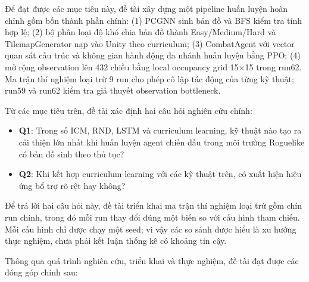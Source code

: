 \vspace{0.5cm}

Để đạt được các mục tiêu này, đề tài xây dựng một pipeline huấn luyện hoàn chỉnh gồm bốn thành phần chính: (1) PCGNN sinh bản đồ và BFS kiểm tra tính hợp lệ; (2) bộ phân loại độ khó chia bản đồ thành Easy/Medium/Hard và TilemapGenerator nạp vào Unity theo curriculum; (3) CombatAgent với vector quan sát cấu trúc và không gian hành động đa nhánh huấn luyện bằng PPO; (4) mở rộng observation lên 432 chiều bằng local occupancy grid 15$\times$15 trong run62. Ma trận thí nghiệm loại trừ 9 run cho phép cô lập tác động của từng kỹ thuật; run59 và run62 kiểm tra giả thuyết observation bottleneck.

\vspace{0.5cm}

Từ các mục tiêu trên, đề tài xác định hai câu hỏi nghiên cứu chính:

\renewcommand{\labelitemi}{$-$}
\begin{itemize}
    \item \textbf{Q1}: Trong số ICM, RND, LSTM và curriculum learning, kỹ thuật nào tạo ra cải thiện lớn nhất khi huấn luyện agent chiến đấu trong môi trường Roguelike có bản đồ sinh theo thủ tục?
    \item \textbf{Q2}: Khi kết hợp curriculum learning với các kỹ thuật trên, có xuất hiện hiệu ứng bổ trợ rõ rệt hay không?
\end{itemize}

Để trả lời hai câu hỏi này, đề tài triển khai ma trận thí nghiệm loại trừ gồm chín run chính, trong đó mỗi run thay đổi đúng một biến so với cấu hình tham chiếu. Mỗi cấu hình chỉ được chạy một seed; vì vậy các so sánh được hiểu là xu hướng thực nghiệm, chưa phải kết luận thống kê có khoảng tin cậy.

\vspace{0.3cm}


Thông qua quá trình nghiên cứu, triển khai và thực nghiệm, đề tài đạt được các đóng góp chính sau:


